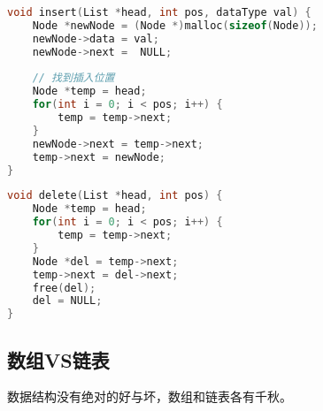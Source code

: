 
\begin{lstlisting}[language=C]
void insert(List *head, int pos, dataType val) {
    Node *newNode = (Node *)malloc(sizeof(Node));
    newNode->data = val;
    newNode->next =  NULL;
    
    // 找到插入位置
    Node *temp = head;
    for(int i = 0; i < pos; i++) {
        temp = temp->next;
    }
    newNode->next = temp->next;
    temp->next = newNode;
}
\end{lstlisting}

\vspace{0.5cm}


\begin{lstlisting}[language=C]
void delete(List *head, int pos) {
    Node *temp = head;
    for(int i = 0; i < pos; i++) {
        temp = temp->next;
    }
    Node *del = temp->next;
    temp->next = del->next;
    free(del);
    del = NULL;
}
\end{lstlisting}

\subsection{数组VS链表}

数据结构没有绝对的好与坏，数组和链表各有千秋。

\begin{table}[H]
	\centering
	\caption{数组VS链表}
\end{table}

